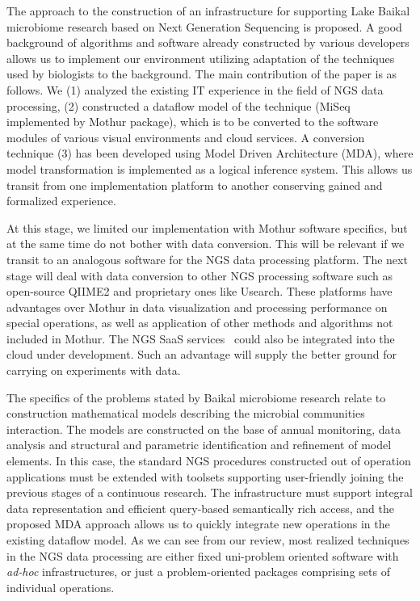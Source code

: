 \documentclass[a4paper]{jpconf}
\begin{document}
The approach to the construction of an infrastructure for supporting Lake Baikal microbiome research based on Next Generation Sequencing is proposed. A good background of algorithms and software already constructed by various developers allows us to implement our environment utilizing adaptation of the techniques used by biologists to the background.  The main contribution of the paper is as follows. We (1) analyzed the existing IT experience in the field of NGS data processing, (2) constructed a dataflow model of the technique (MiSeq implemented by Mothur package), which is to be converted to the software modules of various visual environments and cloud services.  A conversion technique (3) has been developed using Model Driven Architecture (MDA), where model transformation is implemented as a logical inference system. This allows us transit from one implementation platform to another conserving gained and formalized experience.

At this stage, we limited our implementation with Mothur software specifics, but at the same time do not bother with data conversion.  This will be relevant if we transit to an analogous software for the NGS data processing platform.  The next stage will deal with data conversion to other NGS processing software such as open-source QIIME2 and proprietary ones like Usearch.  These platforms have advantages over Mothur in data visualization and processing performance on special operations, as well as application of other methods and algorithms not included in Mothur. The NGS SaaS services~\cite{guo16,kwon15} could also be integrated into the cloud under development.  Such an advantage will supply the better ground for carrying on experiments with data.

The specifics of the problems stated by Baikal microbiome research relate to construction mathematical models describing the microbial communities interaction.   The models are constructed on the base of annual monitoring, data analysis and structural and parametric identification and refinement of model elements.  In this case, the standard NGS procedures constructed out of operation applications must be extended with toolsets supporting user-friendly joining the previous stages of a continuous research.  The infrastructure must support integral data representation and efficient query-based semantically rich access, and the proposed MDA approach allows us to quickly integrate new operations in the existing dataflow model.  As we can see from our review, most realized techniques in the NGS data processing are either fixed uni-problem oriented software with \emph{ad-hoc} infrastructures, or just a problem-oriented packages comprising sets of individual operations.
\end{document}
